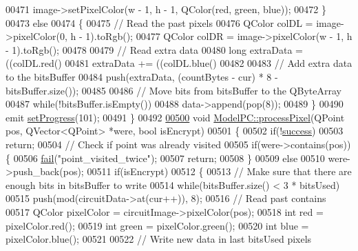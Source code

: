 \begin{DoxyCode}
00471         image->setPixelColor(w - 1, h - 1, QColor(red, green, blue));
00472     \}
00473     \textcolor{keywordflow}{else}
00474     \{
00475         \textcolor{comment}{// Read the past pixels}
00476         QColor colDL = image->pixelColor(0, h - 1).toRgb();
00477         QColor colDR = image->pixelColor(w - 1, h - 1).toRgb();
00478 
00479         \textcolor{comment}{// Read extra data}
00480         \textcolor{keywordtype}{long} extraData = ((colDL.red() %
00481         extraData += ((colDL.blue() %
00482 
00483         \textcolor{comment}{// Add extra data to the bitsBuffer}
00484         push(extraData, (countBytes - cur) * 8 - bitsBuffer.size());
00485 
00486         \textcolor{comment}{// Move bits from bitsBuffer to the QByteArray}
00487         \textcolor{keywordflow}{while}(!bitsBuffer.isEmpty())
00488             data->append(pop(8));
00489     \}
00490     emit \hyperlink{class_model_p_c_afdcd80f0ed5062e145a71f09b0897547}{setProgress}(101);
00491 \}
00492 
\hypertarget{modelpc_8cpp_source.tex_l00500}{}\hyperlink{class_model_p_c_a1171f9fe1550133dc9053a46b4e5bcfd}{00500} \textcolor{keywordtype}{void} \hyperlink{class_model_p_c_a1171f9fe1550133dc9053a46b4e5bcfd}{ModelPC::processPixel}(QPoint pos, QVector<QPoint> *were, \textcolor{keywordtype}{bool} isEncrypt)
00501 \{
00502     \textcolor{keywordflow}{if}(!\hyperlink{class_model_p_c_a945ffbbc44a832b953c191debd448f4c}{success})
00503         \textcolor{keywordflow}{return};
00504     \textcolor{comment}{// Check if point was already visited}
00505     \textcolor{keywordflow}{if}(were->contains(pos))\{
00506         \hyperlink{class_model_p_c_a47464b59b7e37fcee25e55475708aabd}{fail}(\textcolor{stringliteral}{"point\_visited\_twice"});
00507         \textcolor{keywordflow}{return};
00508     \}
00509     \textcolor{keywordflow}{else}
00510         were->push\_back(pos);
00511     \textcolor{keywordflow}{if}(isEncrypt)
00512     \{
00513         \textcolor{comment}{// Make sure that there are enough bits in bitsBuffer to write}
00514         \textcolor{keywordflow}{while}(bitsBuffer.size() < 3 * bitsUsed)
00515             push(mod(circuitData->at(cur++)), 8);
00516         \textcolor{comment}{// Read past contains}
00517         QColor pixelColor = circuitImage->pixelColor(pos);
00518         \textcolor{keywordtype}{int} red = pixelColor.red();
00519         \textcolor{keywordtype}{int} green = pixelColor.green();
00520         \textcolor{keywordtype}{int} blue = pixelColor.blue();
00521 
00522         \textcolor{comment}{// Write new data in last bitsUsed pixels}

\end{DoxyCode}

